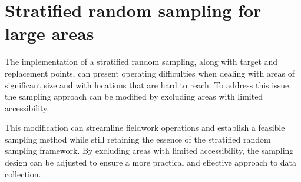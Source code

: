 \documentclass[
]{book}
\begin{document}
\hypertarget{stratified-random-sampling-for-large-areas}{%
\section{Stratified random sampling for large areas}\label{stratified-random-sampling-for-large-areas}}

The implementation of a stratified random sampling, along with target and replacement points, can present operating difficulties when dealing with areas of significant size and with locations that are hard to reach. To address this issue, the sampling approach can be modified by excluding areas with limited accessibility.

This modification can streamline fieldwork operations and establish a feasible sampling method while still retaining the essence of the stratified random sampling framework. By excluding areas with limited accessibility, the sampling design can be adjusted to ensure a more practical and effective approach to data collection.
\end{document}
